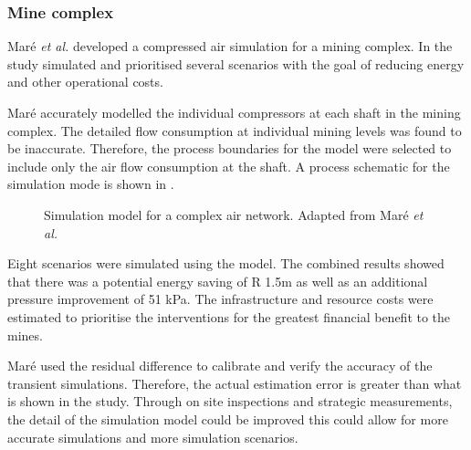 \subsubsection{Mine complex}
Maré \textit{et al.} \cite{Mare2017Evaluating} developed a compressed air simulation for a mining complex. In the study \cite{Mare2017Evaluating} simulated and prioritised several scenarios with the goal of reducing energy and other operational costs. 
\par
 Maré accurately modelled the individual compressors at each shaft in the mining complex. The detailed flow consumption at individual mining levels was found to be inaccurate. Therefore, the process boundaries for the model were selected to include only the air flow consumption at the shaft. A process schematic for the simulation mode is shown in .
 
 \begin{figure}[h!]
 	\centering
 	\caption[Simulation model for a complex air network]{Simulation model for a complex air network. Adapted from Maré \textit{et al.} \cite{Mare2017Evaluating}}
 	\label{fig:Mare model}
 \end{figure}
\par 
 Eight scenarios were simulated using the model. The combined results showed that there was a potential energy saving of R 1.5m as well as an additional pressure improvement of 51 kPa. The infrastructure and resource costs were estimated to prioritise the interventions for the greatest financial benefit to the mines.	
\par
	Maré used the residual difference to calibrate and verify the accuracy of the transient simulations. Therefore, the actual estimation error is greater than what is shown in the study. Through on site inspections and strategic measurements, the detail of the simulation model could be improved this could allow for more accurate simulations and more simulation scenarios.

